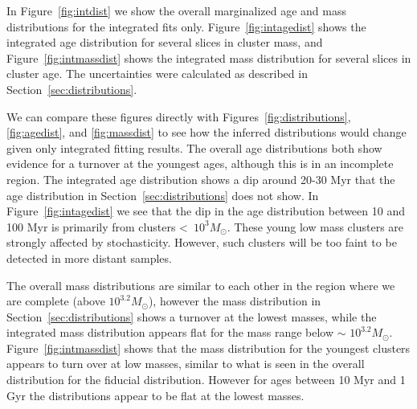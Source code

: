 \documentclass{emulateapj}
\begin{document}
In Figure~\ref{fig:intdist} we show the overall marginalized age and mass distributions for the integrated fits only.  Figure~\ref{fig:intagedist} shows the integrated age distribution for several slices in cluster mass, and Figure~\ref{fig:intmassdist} shows the integrated mass distribution for several slices in cluster age.  The uncertainties were calculated as described in Section~\ref{sec:distributions}.

We can compare these figures directly with Figures~\ref{fig:distributions}, \ref{fig:agedist}, and \ref{fig:massdist} to see how the inferred distributions would change given only integrated fitting results.  The overall age distributions both show evidence for a turnover at the youngest ages, although this is in an incomplete region.  The integrated age distribution shows a dip around 20-30 Myr that the age distribution in Section~\ref{sec:distributions} does not show.  In Figure~\ref{fig:intagedist} we see that the dip in the age distribution between 10 and 100 Myr is primarily from clusters \textless\ $10^3 M_{\odot}$.  These young low mass clusters are strongly affected by stochasticity.  However, such clusters will be too faint to be detected in more distant samples.

The overall mass distributions are similar to each other in the region where we are complete (above $10^{3.2} M_{\odot}$), however the mass distribution in Section~\ref{sec:distributions} shows a turnover at the lowest masses, while the integrated mass distribution appears flat for the mass range below $\sim$ $10^{3.2} M_{\odot}$.  Figure~\ref{fig:intmassdist} shows that the mass distribution for the youngest clusters appears to turn over at low masses, similar to what is seen in the overall distribution for the fiducial distribution.  However for ages between 10 Myr and 1 Gyr the distributions appear to be flat at the lowest masses.  
\end{document}
